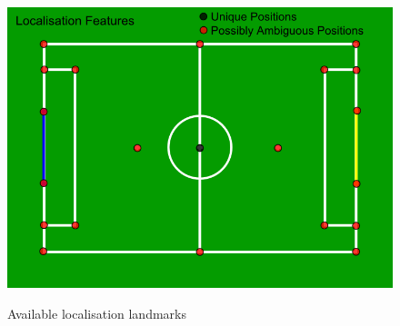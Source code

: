 \begin{figure}[!h]
\begin{center}
   \leavevmode
    \scalebox{0.5} {\includegraphics{figs/LocalisationPoints.png} }
    \caption{Available localisation landmarks}
    \label{fig:LocalisationPoints}
\end{center}
\end{figure}

